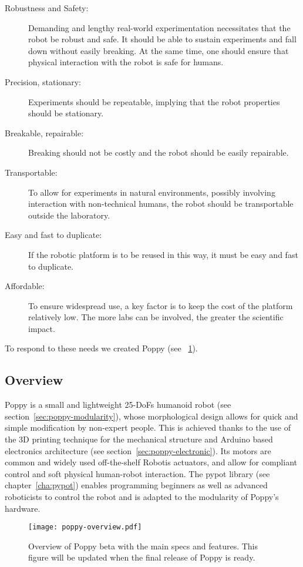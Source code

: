 \begin{description}
    \item[Robustness and Safety:] Demanding and lengthy real-world experimentation necessitates that the robot be robust and safe. It should be able to sustain experiments and fall down without easily breaking. At the same time, one should ensure that physical interaction with the robot is safe for humans.
    \item [Precision, stationary:]Experiments should be repeatable, implying that the robot properties should be stationary.
    \item [Breakable, repairable:] Breaking should not be costly and the robot should be easily repairable.
    \item [Transportable:] To allow for experiments in natural environments, possibly involving interaction with non-technical humans, the robot should be transportable outside the laboratory.
    \item [Easy and fast to duplicate:]If the robotic platform is to be reused  in this way, it must be easy and fast to duplicate.
    \item [Affordable:] To ensure widespread use, a key factor is to keep the cost of the platform relatively low. The more labs can be involved, the greater the scientific impact.
\end{description}

To respond to these needs we created Poppy (see \figurename~\ref{fig:poppyv0.1_overview}).

\subsection{Overview} %

Poppy is a small and lightweight 25-DoFs humanoid robot (see section~\ref{sec:poppy-modularity}), whose morphological design allows for quick and simple modification by non-expert people. This is achieved thanks to the use of the 3D printing technique for the mechanical structure and Arduino based electronics architecture (see section~\ref{sec:poppy-electronic}). Its motors are common and widely used off-the-shelf Robotis actuators, and allow for compliant control and soft physical human-robot interaction. The pypot library (see chapter~\ref{cha:pypot}) enables programming beginners as well as advanced roboticists to control the robot and is adapted to the modularity of Poppy’s hardware.

\begin{figure}[tb]
    \begin{center}
        \texttt{[image: poppy-overview.pdf]}
    \end{center}
    \caption{Overview of Poppy beta with the main specs and features. This figure will be updated when the final release of Poppy is ready.}
    \label{fig:poppyv0.1_overview}
\end{figure}

